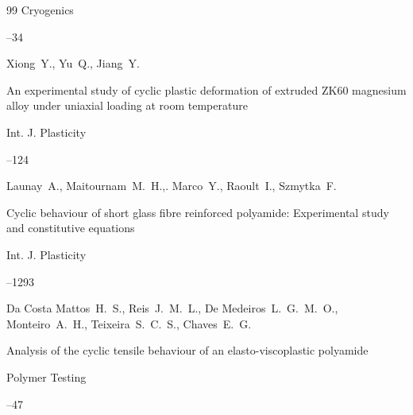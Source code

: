 \begin{thebibliography}{99}
\jour Cryogenics



--34







\by Xiong~Y., Yu~Q., Jiang~Y.

\paper An experimental study of cyclic plastic deformation of extruded ZK60 magnesium alloy under uniaxial loading at room temperature

\jour Int. J. Plasticity




--124







\by Launay~A., Maitournam~M.~H.,. Marco~Y., Raoult~I., Szmytka~F.

\paper Cyclic behaviour of short glass fibre reinforced polyamide: Experimental study and constitutive equations 

\jour Int. J. Plasticity




--1293







\by Da Costa Mattos~H.~S., Reis~J.~M.~L., De Medeiros~L.~G.~M.~O., Monteiro~A.~H., Teixeira~S.~C.~S., Chaves~E.~G.

\paper Analysis of the cyclic tensile behaviour of an elasto-viscoplastic polyamide 

\jour Polymer Testing



--47







\end{thebibliography}
